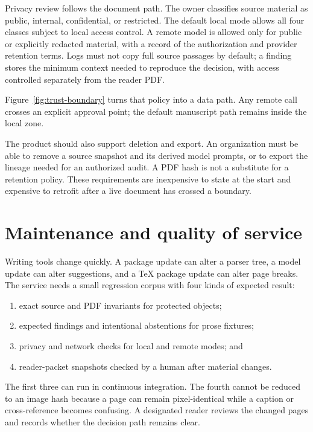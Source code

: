 Privacy review follows the document path. The owner classifies source material
as public, internal, confidential, or restricted. The default local mode
allows all four classes subject to local access control. A remote model is
allowed only for public or explicitly redacted material, with a record of the
authorization and provider retention terms. Logs must not copy full source
passages by default; a finding stores the minimum context needed to reproduce
the decision, with access controlled separately from the reader PDF.

Figure~\ref{fig:trust-boundary} turns that policy into a data path. Any remote
call crosses an explicit approval point; the default manuscript path remains
inside the local zone.

\hvFigureTrustBoundary

The product should also support deletion and export. An organization must be
able to remove a source snapshot and its derived model prompts, or to export
the lineage needed for an authorized audit. A PDF hash is not a substitute for
a retention policy. These requirements are inexpensive to state at the start
and expensive to retrofit after a live document has crossed a boundary.

\section{Maintenance and quality of service}
\label{sec:ops-maintenance}

Writing tools change quickly. A package update can alter a parser tree, a model
update can alter suggestions, and a TeX package update can alter page breaks.
The service needs a small regression corpus with four kinds of expected result:

\begin{enumerate}
\item exact source and PDF invariants for protected objects;
\item expected findings and intentional abstentions for prose fixtures;
\item privacy and network checks for local and remote modes; and
\item reader-packet snapshots checked by a human after material changes.
\end{enumerate}

The first three can run in continuous integration. The fourth cannot be
reduced to an image hash because a page can remain pixel-identical while a
caption or cross-reference becomes confusing. A designated reader reviews the
changed pages and records whether the decision path remains clear.

